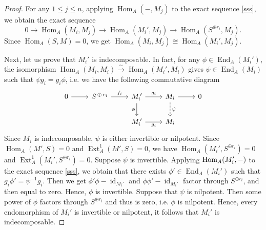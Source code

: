 \documentclass[reqno,12pt]{amsart}
\numberwithin{equation}{section}
\theoremstyle{plain}
\theoremstyle{definition}
\begin{document}
\begin{proof}
For any $1\leq j\leq n$, applying $\operatorname{Hom}_A(-,M_j)$ to the exact sequence \eqref{sss}, we obtain the exact sequence
\begin{equation*}
0 \longrightarrow \operatorname{Hom}_A(M_i,M_j) \longrightarrow \operatorname{Hom}_A(M_i',M_j)\longrightarrow \operatorname{Hom}_A(S^{\oplus r_i},M_j).
\end{equation*}
Since $\operatorname{Hom}_A(S,M)=0$, we get $\operatorname{Hom}_A(M_i,M_j) \cong \operatorname{Hom}_A(M_i',M_j)$.


Next, let us prove that $M_i'$ is indecomposable. In fact, for any
$\phi\in\operatorname{End}_A(M_i')$,
the isomorphism
$\operatorname{Hom}_A(M_i,M_i)
\xrightarrow{\sim}
\operatorname{Hom}_A(M_i',M_i)$
gives $\psi\in\operatorname{End}_A(M_i)$ such that
$\psi g_i=g_i\phi$, i.e. we have the following commutative diagram
\begin{equation*}
\begin{tikzcd}
	0 & {S^{\,\oplus\,r_i}} & {M_i^{\,\prime}} & {M_i} & 0 \\
	&& {M_i^{\,\prime}} & {M_i}
	\arrow[from=1-1, to=1-2]
	\arrow["{f_i}", from=1-2, to=1-3]
	\arrow["{g_i}", from=1-3, to=1-4]
	\arrow["\phi"', from=1-3, to=2-3]
	\arrow[from=1-4, to=1-5]
	\arrow["\psi", dashed, from=1-4, to=2-4]
	\arrow["{g_i}"', from=2-3, to=2-4]
\end{tikzcd}
\end{equation*}
Since $M_i$ is indecomposable, $\psi$ is either
invertible or nilpotent. Since $\operatorname{Hom}_A(M',S)=0$ and $\operatorname{Ext}_A^1(M',S)=0$, we have
$\operatorname{Hom}_A(M_i',S^{\oplus r_i})=0$ and $\operatorname{Ext}_A^1(M_i',S^{\oplus r_i})=0$.
Suppose $\psi$ is invertible. Applying $\mbox{\rm Hom}_A(M_i',-)$ to the exact sequence \eqref{sss}, we obtain that there exists $\phi'\in\operatorname{End}_A(M_i')$ such that $g_i\phi'=\psi^{-1}g_i$. Then we get
$\phi'\phi-\operatorname{id}_{M_i'}$ and $\phi\phi'-\operatorname{id}_{M_i'}$ factor through
$S^{\oplus r_i}$, and then equal to zero. Hence, $\phi$
is invertible.
Suppose that $\psi$ is nilpotent. Then some power of $\phi$
factors through $S^{\oplus r_i}$ and thus is zero, i.e. $\phi$ is nilpotent. Hence, every
endomorphism of $M_i'$ is invertible or nilpotent, it follows that $M_i'$ is indecomposable.




\end{proof}
\end{document}
